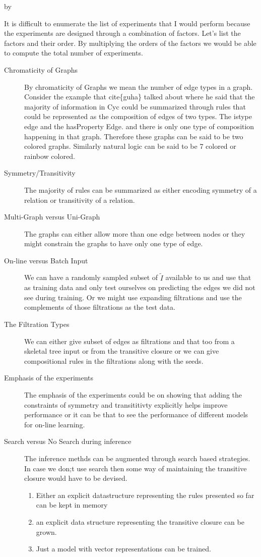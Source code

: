 \documentclass[12pt]{exam} %
\makeatletter
\renewcommand{\cite}[1]{cite\{#1\}}
\def\SetTotalwidth{\advance\linewidth by \@totalleftmargin
\@totalleftmargin=0pt}
\newcommand{\answer}[1]{
\ifprintanswers
\SetTotalwidth
  \begin{solution}[0in]#1\end{solution}
\else \fi
}
\makeatother
\begin{document}
\begin{questions}
\answer{
It is difficult to enumerate the list of experiments that I would
perform because the experiments are designed through a combination of
factors. Let's list the factors and their order. By multiplying the
orders of the factors we would be able to compute the total number of
experiments.
\begin{description}
\item [Chromaticity of Graphs]
  By chromaticity of Graphs we mean the number of edge types in a
  graph. Consider the example that \cite{guha} talked about where he
  said that the majority of information in Cyc could be summarized
  through rules that could be represented as the composition of edges
  of two types. The istype edge and the hasProperty Edge. and there is
  only one type of composition happening in that graph. Therefore
  these graphs can be said to be two colored graphs. Similarly natural
  logic can be said to be 7 colored or rainbow colored.
\item [Symmetry/Transitivity] The majority of rules can be summarized
  as either encoding symmetry of a relation or transitivity of a relation.
\item [Multi-Graph versus Uni-Graph] The graphs can either allow more
  than one edge between nodes or they might constrain the graphs to
  have only one type of edge.
\item[On-line versus Batch Input] We can have a randomly sampled
  subset of $\tilde{I}$ available to us and use that as training data
  and only test ourselves on predicting the edges we did not see
  during training. Or we might use expanding filtrations and use the
  complements of those filtrations as the test data.
\item [The Filtration Types] We can either give subset of edges as
  filtrations and that too from a skeletal tree input or from the
  transitive closure or we can give compositional rules in the
  filtrations along with the seeds.
\item [Emphasis of the experiments] The emphasis of the experiments
  could be on showing that adding the constraints of symmetry and
  transititivty explicitly helps improve performance or it can be that
  to see the performance of different models for on-line learning.
\item [Search versus No Search during inference] The inference methds
  can be augmented through search based strategies. In case we don;t
  use search then some way of maintaining the transitive closure would
  have to be devised.
  \begin{enumerate}
  \item Either an explicit datastructure representing
    the rules presented so far can be kept in memory
  \item an explicit data structure representing the transitive closure
    can be grown.
  \item Just a model with vector representations can be trained.
  \end{enumerate}
\end{description}
}


\end{questions}
\end{document}
